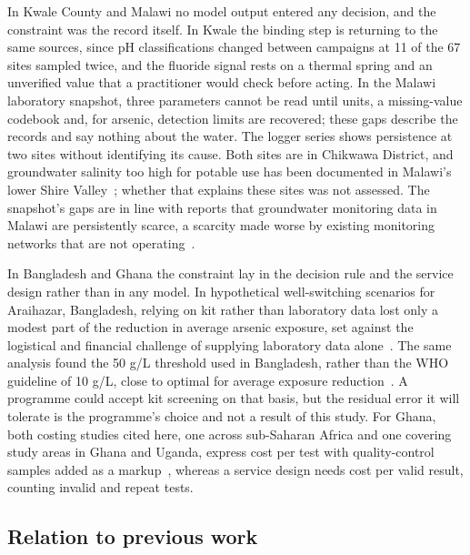 \documentclass[10pt,letterpaper]{article}
\begin{document}
In Kwale County and Malawi no model output entered any decision, and the constraint was the record itself. In Kwale the binding step is returning to the same sources, since pH classifications changed between campaigns at 11 of the 67 sites sampled twice, and the fluoride signal rests on a thermal spring and an unverified value that a practitioner would check before acting. In the Malawi laboratory snapshot, three parameters cannot be read until units, a missing-value codebook and, for arsenic, detection limits are recovered; these gaps describe the records and say nothing about the water. The logger series shows persistence at two sites without identifying its cause. Both sites are in Chikwawa District, and groundwater salinity too high for potable use has been documented in Malawi's lower Shire Valley~\cite{BGS-Earthwise-Malawi}; whether that explains these sites was not assessed. The snapshot's gaps are in line with reports that groundwater monitoring data in Malawi are persistently scarce, a scarcity made worse by existing monitoring networks that are not operating~\cite{Robertson2026-PLOSW0000593}.

In Bangladesh and Ghana the constraint lay in the decision rule and the service design rather than in any model. In hypothetical well-switching scenarios for Araihazar, Bangladesh, relying on kit rather than laboratory data lost only a modest part of the reduction in average arsenic exposure, set against the logistical and financial challenge of supplying laboratory data alone~\cite{Jameel2021}. The same analysis found the 50 \textmu{}g/L threshold used in Bangladesh, rather than the WHO guideline of 10 \textmu{}g/L, close to optimal for average exposure reduction~\cite{Jameel2021}. A programme could accept kit screening on that basis, but the residual error it will tolerate is the programme's choice and not a result of this study. For Ghana, both costing studies cited here, one across sub-Saharan Africa and one covering study areas in Ghana and Uganda, express cost per test with quality-control samples added as a markup~\cite{Delaire2017,Trimmer2024}, whereas a service design needs cost per valid result, counting invalid and repeat tests.

\subsection*{Relation to previous work}
\end{document}
